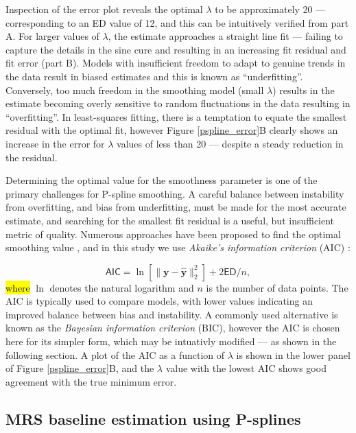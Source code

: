 \documentclass[num-refs]{wiley-article}
\newcommand{\revtwo}[2]{\hl{#1}\marginnote{\hl{#2}}}
\begin{document}
Inspection of the error plot reveals the optimal $\lambda$ to be approximately 20 --- corresponding to an ED value of 12, and this can be intuitively verified from part A. For larger values of $\lambda$, the estimate approaches a straight line fit --- failing to capture the details in the sine cure and resulting in an increasing fit residual and fit error (part B). Models with insufficient freedom to adapt to genuine trends in the data result in biased estimates and this is known as ``underfitting''. Conversely, too much freedom in the smoothing model (small $\lambda$) results in the estimate becoming overly sensitive to random fluctuations in the data resulting in ``overfitting''. In least-squares fitting, there is a temptation to equate the smallest residual with the optimal fit, however Figure \ref{pspline_error}B clearly shows an increase in the error for $\lambda$ values of less than 20 --- despite a steady reduction in the residual.

Determining the optimal value for the smoothness parameter is one of the primary challenges for P-spline smoothing. A careful balance between instability from overfitting, and bias from underfitting, must be made for the most accurate estimate, and searching for the smallest fit residual is a useful, but insufficient metric of quality. Numerous approaches have been proposed to find the optimal smoothing value \cite{Ruppert2003}, and in this study we use \textit{Akaike's information criterion} (AIC) \cite{Akaike1973}:

\begin{equation}
  \textsf{AIC} = \ln \left[ \|\mathbf{y} - \hat{\mathbf{y}}\|^{2}_{2} \right] + 2 \textsf{ED} / n,
  \label{aic}
\end{equation}
\revtwo{where}{R1.2} $\ln$ denotes the natural logarithm and $n$ is the number of data points. The AIC is typically used to compare models, with lower values indicating an improved balance between bias and instability. A commonly used alternative is known as the \textit{Bayesian information criterion} (BIC), however the AIC is chosen here for its simpler form, which may be intuativly modified --- as shown in the following section. A plot of the AIC as a function of $\lambda$ is shown in the lower panel of Figure \ref{pspline_error}B, and the $\lambda$ value with the lowest AIC shows good agreement with the true minimum error.

\subsection{MRS baseline estimation using P-splines}
\end{document}
